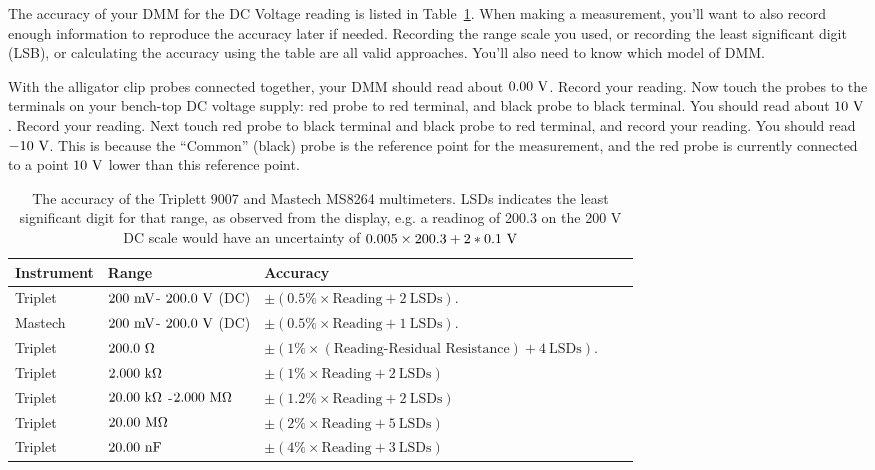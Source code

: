 The accuracy of your DMM for the DC Voltage reading is listed in
Table~\ref{tbl:accuracy}.  When making a measurement, you'll want to
also record enough information to reproduce the accuracy later if
needed.  Recording the range scale you used, or recording the least
significant digit (LSB), or calculating the accuracy using the table
are all valid approaches.  You'll also need to know which model of DMM.

\begin{measurement} 
With the alligator clip probes connected together, your DMM should
read about $0.00~\rm V$.  Record your reading.  Now touch the probes
to the terminals on your bench-top DC voltage supply: red probe to red
terminal, and black probe to black terminal.  You should read about
$10~\rm V$. Record your reading.  Next touch red probe to black
terminal and black probe to red terminal, and record your reading.
You should read $-10~\rm V$.  This is because the ``Common'' (black)
probe is the reference point for the measurement, and the red probe is
currently connected to a point $10~\rm V$ lower than this reference
point.
\end{measurement}


\begin{table}[h!]
\normalsize %
\begin{tabular}{ lllll }
\hline
\textbf{Instrument} &\textbf{Range} & \textbf{Accuracy}  \\
\hline
Triplet & $200~\rm mV$- $200.0~\rm V$ (DC) & $\pm (0.5\% \times \mbox{Reading}+ 2~\mbox{LSDs})$. \\
\hline
Mastech & $200~\rm mV$- $200.0~\rm V$ (DC) & $\pm (0.5\% \times \mbox{Reading}+ 1~\mbox{LSDs})$. \\
\hline
Triplet & $200.0~\rm \Omega$ & $\pm (1\% \times (\mbox{Reading-Residual Resistance} )+ 4~\mbox{LSDs})$. \\
\hline
Triplet & $2.000~\rm k\Omega$ & $\pm (1\% \times \mbox{Reading} + 2~\mbox{LSDs})$  \\
\hline
Triplet & $20.00~\rm k\Omega$ -$2.000~\rm M\Omega$ & $\pm (1.2\% \times \mbox{Reading} + 2~\mbox{LSDs})$  \\
\hline
Triplet & $20.00~\rm M\Omega$ & $\pm (2\% \times \mbox{Reading} + 5~\mbox{LSDs})$  \\
\hline
Triplet & $20.00~\rm nF$ & $\pm (4\% \times \mbox{Reading} + 3~\mbox{LSDs})$  \\
\hline
\end{tabular} 
\caption{The accuracy of the Triplett 9007 and Mastech MS8264 multimeters. LSDs indicates the least significant digit for that range, as observed from the display, e.g. a readinog of 200.3 on the 200 V DC scale would have an uncertainty of $0.005 \times 200.3 + 2 * 0.1~\rm V$}
\label{tbl:accuracy}
\end{table}


